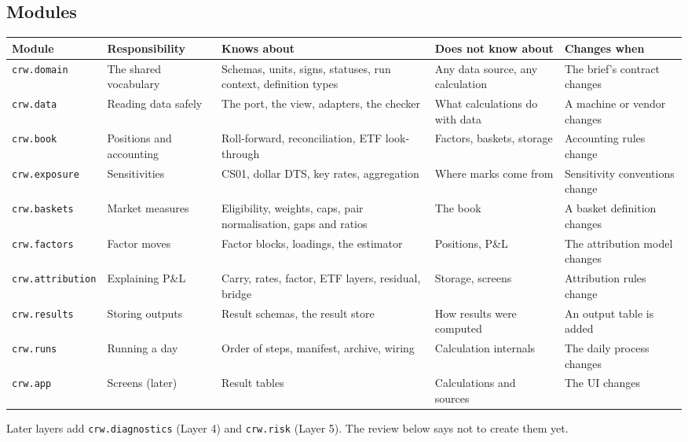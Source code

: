 \documentclass[11pt,a4paper]{article}
\newcommand{\code}[1]{\texttt{\small #1}}
\begin{document}
\subsection{Modules}
\begin{center}\footnotesize
\begin{tabularx}{\linewidth}{@{}l>{\raggedright}p{3.2cm}>{\raggedright}p{3.1cm}>{\raggedright}p{3.1cm}X@{}}\toprule
Module & Responsibility & Knows about & Does not know about & Changes when \\\midrule
\code{crw.domain} & The shared vocabulary & Schemas, units, signs, statuses, run context, definition types & Any data source, any calculation & The brief's contract changes \\
\code{crw.data} & Reading data safely & The port, the view, adapters, the checker & What calculations do with data & A machine or vendor changes \\
\code{crw.book} & Positions and accounting & Roll-forward, reconciliation, ETF look-through & Factors, baskets, storage & Accounting rules change \\
\code{crw.exposure} & Sensitivities & CS01, dollar DTS, key rates, aggregation & Where marks come from & Sensitivity conventions change \\
\code{crw.baskets} & Market measures & Eligibility, weights, caps, pair normalisation, gaps and ratios & The book & A basket definition changes \\
\code{crw.factors} & Factor moves & Factor blocks, loadings, the estimator & Positions, P\&L & The attribution model changes \\
\code{crw.attribution} & Explaining P\&L & Carry, rates, factor, ETF layers, residual, bridge & Storage, screens & Attribution rules change \\
\code{crw.results} & Storing outputs & Result schemas, the result store & How results were computed & An output table is added \\
\code{crw.runs} & Running a day & Order of steps, manifest, archive, wiring & Calculation internals & The daily process changes \\
\code{crw.app} & Screens (later) & Result tables & Calculations and sources & The UI changes \\\bottomrule
\end{tabularx}
\end{center}
Later layers add \code{crw.diagnostics} (Layer 4) and \code{crw.risk} (Layer 5). The review below says not to create them yet.
\end{document}

